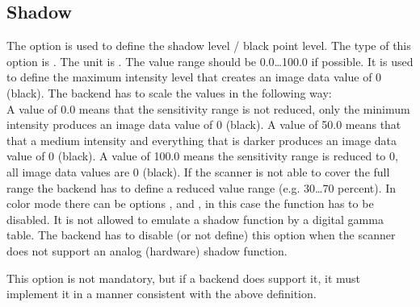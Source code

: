 \documentclass[11pt,DVIps]{report}
\begin{document}
\subsection{Shadow}
\begin{changebar}
The option  is used to define the shadow level / black point level.
The type of this option is .
The unit is . The value range
should be 0.0\ldots100.0 if possible.
It is used to define the maximum intensity level that creates an image data value
of 0 (black).  The backend has to scale the values in the following way:\\
A value of 0.0 means that the sensitivity range is not reduced, only the
minimum intensity produces an image data value of 0 (black).
A value of 50.0 means that that a medium intensity and everything that is darker
produces an image data value of 0 (black).
A value of 100.0 means the sensitivity range is reduced to 0, all image
data values are 0 (black).  If the scanner is not able to
cover the full range the backend has to define a reduced
value range (e.g. 30\ldots70 percent).
In color mode there can be options , 
and , in this case the  function has to be disabled.
It is not allowed to emulate a shadow function by
a digital gamma table. The backend has to disable (or not
define) this option when the scanner does not support an
analog (hardware) shadow function.

This option is not mandatory, but if a backend does support it, it
must implement it in a manner consistent with the above definition.\\
\end{changebar}
\end{document}
